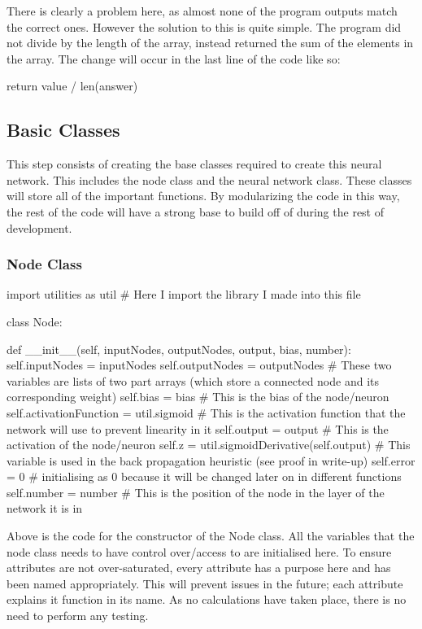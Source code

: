 \documentclass{report}
\begin{document}
\noindent There is clearly a problem here, as almost none of the program outputs match the correct ones. However the solution to this is quite simple. The program did not divide by the length of the array, instead returned the sum of the elements in the array. The change will occur in the last line of the code like so:
\begin{python}
    return value / len(answer)
\end{python}
\newpage

\subsection{Basic Classes}
This step consists of creating the base classes required to create this neural network. This includes the node class and the neural network class. These classes will store all of the important functions. By modularizing the code in this way, the rest of the code will have a strong base to build off of during the rest of development.

\subsubsection{Node Class}
\begin{python}
import utilities as util # Here I import the library I made into this file

class Node:
    
    def __init__(self, inputNodes, outputNodes, output, bias, number):
        self.inputNodes = inputNodes 
        self.outputNodes = outputNodes   # These two variables are lists of two part arrays (which store a connected node and its corresponding weight)
        self.bias = bias # This is the bias of the node/neuron
        self.activationFunction = util.sigmoid # This is the activation function that the network will use to prevent linearity in it
        self.output = output # This is the activation of the node/neuron
        self.z = util.sigmoidDerivative(self.output) # This variable is used in the back propagation heuristic (see proof in write-up)
        self.error = 0 # initialising as 0 because it will be changed later on in different functions
        self.number = number # This is the position of the node in the layer of the network it is in
\end{python}
Above is the code for the constructor of the Node class. All the variables that the node class needs to have control over/access to are initialised here. To ensure attributes are not over-saturated, every attribute has a purpose here and has been named appropriately. This will prevent issues in the future; each attribute explains it function in its name. As no calculations have taken place, there is no need to perform any testing.
\newpage
\end{document}
